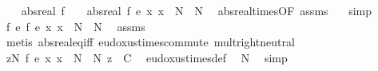 \begin{isabellebody}
\ \ \isamarkupfalse%
\ {\isachardoublequoteopen}abs{\isacharunderscore}{\kern0pt}real\ f\ {\isacharasterisk}{\kern0pt}\ {}\ {\isacharequal}{\kern0pt}\ abs{\isacharunderscore}{\kern0pt}real\ {\isacharparenleft}{\kern0pt}f\ {\isacharasterisk}{\kern0pt}\isactrlsub e\ {\isacharparenleft}{\kern0pt}{\isasymlambda}x{\isachardot}{\kern0pt}\ x\ {\isacharplus}{\kern0pt}\ N{\isacharprime}{\kern0pt}\ {\isacharminus}{\kern0pt}\ N{\isacharparenright}{\kern0pt}{\isacharparenright}{\kern0pt}{\isachardoublequoteclose}\ \isamarkupfalse%
\ abs{\isacharunderscore}{\kern0pt}real{\isacharunderscore}{\kern0pt}times{\isacharbrackleft}{\kern0pt}OF\ assms{\isacharparenleft}{\kern0pt}{}{\isacharparenright}{\kern0pt}\ {\isacharasterisk}{\kern0pt}{\isacharparenleft}{\kern0pt}{}{\isacharparenright}{\kern0pt}{\isacharbrackright}{\kern0pt}\ \isamarkupfalse%
\ simp\isanewline
\ \ \isamarkupfalse%
\ {\isachardoublequoteopen}f\ {\isasymsim}\isactrlsub e\ {\isacharparenleft}{\kern0pt}f\ {\isacharasterisk}{\kern0pt}\isactrlsub e\ {\isacharparenleft}{\kern0pt}{\isasymlambda}x{\isachardot}{\kern0pt}\ x\ {\isacharplus}{\kern0pt}\ N{\isacharprime}{\kern0pt}\ {\isacharminus}{\kern0pt}\ N{\isacharparenright}{\kern0pt}{\isacharparenright}{\kern0pt}{\isachardoublequoteclose}\ \isamarkupfalse%
\ assms\ {\isacharasterisk}{\kern0pt}\ \isamarkupfalse%
\ {\isacharparenleft}{\kern0pt}metis\ abs{\isacharunderscore}{\kern0pt}real{\isacharunderscore}{\kern0pt}eq{\isacharunderscore}{\kern0pt}iff\ eudoxus{\isacharunderscore}{\kern0pt}times{\isacharunderscore}{\kern0pt}commute\ mult{\isachardot}{\kern0pt}right{\isacharunderscore}{\kern0pt}neutral{\isacharparenright}{\kern0pt}\isanewline
\ \ \isamarkupfalse%
\ \isamarkupfalse%
\ {\isachardoublequoteopen}{\isasymforall}z{\isacharless}{\kern0pt}N{\isachardot}{\kern0pt}\ {\isacharparenleft}{\kern0pt}f\ {\isacharasterisk}{\kern0pt}\isactrlsub e\ {\isacharparenleft}{\kern0pt}{\isasymlambda}x{\isachardot}{\kern0pt}\ x\ {\isacharplus}{\kern0pt}\ N{\isacharprime}{\kern0pt}\ {\isacharminus}{\kern0pt}\ N{\isacharparenright}{\kern0pt}{\isacharparenright}{\kern0pt}\ z\ {\isacharless}{\kern0pt}\ C{\isachardoublequoteclose}\ \isamarkupfalse%
\ eudoxus{\isacharunderscore}{\kern0pt}times{\isacharunderscore}{\kern0pt}def\ \isamarkupfalse%
\ N{\isacharprime}{\kern0pt}\ \isamarkupfalse%
\ simp\isanewline
\ \ \isamarkupfalse%
\ \isamarkupfalse%

\end{isabellebody}
